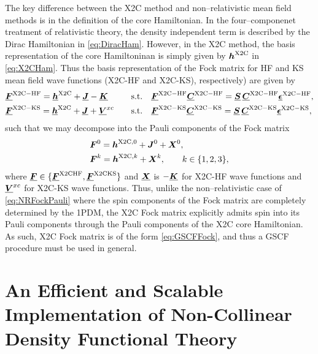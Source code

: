 The key difference between the X2C method and non--relativistic mean field methods is in the definition of
the core Hamiltonian. In the four--componenet treatment of relativistic theory, the density independent term
is described by the Dirac Hamiltonian in \cref{eq:DiracHam}. However, in the X2C method, the basis representation
of the core Hamiltoninan is simply given by $\boldsymbol{h}^{\mathrm{X2C}}$ in \cref{eq:X2CHam}. Thus the basis representation of
the Fock matrix for HF and KS mean field wave functions (X2C-HF and X2C-KS), respectively) are given by
\begin{alignat}{2}
  \label{eq:X2CHFRH}
  &\boldsymbol{\underline{F}}^\mathrm{X2C-HF} = \boldsymbol{\underline{h}}^{\mathrm{X2C}} + \boldsymbol{\underline{J}} - \boldsymbol{\underline{K}}         && 
    \quad \text{s.t.}\quad \boldsymbol{\underline{F}}^\mathrm{X2C-HF} \boldsymbol{\underline{C}}^\mathrm{X2C-HF} = \boldsymbol{\underline{S}}\, \boldsymbol{\underline{C}}^\mathrm{X2C-HF} \boldsymbol{\underline{\epsilon}}^\mathrm{X2C-HF}, \\
  \label{eq:X2CKSRH}
  &\boldsymbol{\underline{F}}^\mathrm{X2C-KS} = \boldsymbol{\underline{h}}^{\mathrm{X2C}} + \boldsymbol{\underline{J}} + \boldsymbol{\underline{V}}^{xc} &&
    \quad \text{s.t.}\quad \boldsymbol{\underline{F}}^\mathrm{X2C-KS} \boldsymbol{\underline{C}}^\mathrm{X2C-KS} = \boldsymbol{\underline{S}}\, \boldsymbol{\underline{C}}^\mathrm{X2C-KS} \boldsymbol{\underline{\epsilon}}^\mathrm{X2C-KS},
\end{alignat}
such that we may decompose into the Pauli components of the Fock matrix
\begin{align}
  &\boldsymbol{F}^{0} = \boldsymbol{h}^{\mathrm{X2C},0} + \boldsymbol{J}^0 + \boldsymbol{X}^0, \\
  &\boldsymbol{F}^{k} = \boldsymbol{h}^{\mathrm{X2C},k} +  \boldsymbol{X}^k,\qquad k\in \{1,2,3\},
\end{align}
where $\boldsymbol{\underline{F}} \in \{\boldsymbol{\underline{F}}^\mathrm{X2CHF}, \boldsymbol{\underline{F}}^\mathrm{X2CKS} \}$ and $\boldsymbol{\underline{X}}$ is $-\boldsymbol{\underline{K}}$ for X2C-HF
wave functions and  $\boldsymbol{\underline{V}}^{xc}$ for X2C-KS wave functions. Thus, unlike the non--relativistic case of 
\cref{eq:NRFockPauli} where the spin components of the Fock matrix are completely determined by the 1PDM, the 
X2C Fock matrix explicitly admits spin into its Pauli components through the Pauli components of the X2C
core Hamiltonian. As such, X2C Fock matrix is of the form \cref{eq:GSCFFock}, and thus a GSCF procedure 
must be used in general.













\section{An Efficient and Scalable Implementation of Non-Collinear Density Functional Theory}
\label{sec:NCDFT}


